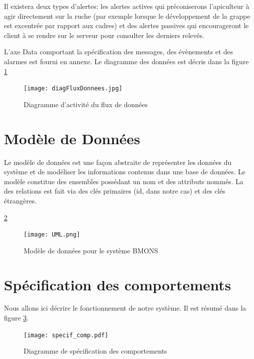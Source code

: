 Il existera deux types d'alertes: les alertes actives qui préconiserons l'apiculteur à agir directement sur la ruche (par exemple lorsque le développement de la grappe est excentrée par rapport aux cadres) et des alertes passives qui encourageront le client à se rendre sur le serveur pour consulter les derniers relevés.   

L'axe Data comportant la spécification des messages, des évènements et des alarmes est fourni en annexe.
Le diagramme des données est décris dans la figure \ref{fig:donnees} 



\begin{figure}[h!]
\centering\texttt{[image: diagFluxDonnees.jpg]}
\caption{\label{fig:donnees} Diagramme d'activité du flux de données}
\end{figure}

\clearpage

\section{Modèle de Données}
\vspace{1.5cm}
Le modèle de données est une façon abstraite de représenter les données du système et de modéliser les informations contenus dans une base de données. Le modèle constitue des ensembles possédant un nom et des attributs nommés. La  des relations est fait via des clés primaires (id, dans notre cas) et des clés étrangères.  

\ref{fig:UML} 



\begin{figure}[h!]
\centering\texttt{[image: UML.png]}
\caption{\label{fig:UML} Modèle de données pour le système BMONS}
\end{figure}

\clearpage

\section{Spécification des comportements}
\vspace{1.5cm}
Nous allons ici décrire le fonctionnement de notre système. Il est résumé dans la figure \ref{fig:sp_comp}.

\begin{figure}[h!]
\centering\texttt{[image: specif\_comp.pdf]}
\caption{\label{fig:sp_comp} Diagramme de spécification des comportements}
\end{figure}

